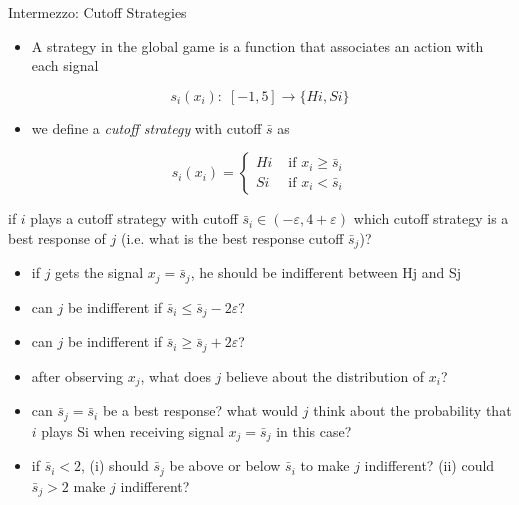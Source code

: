 \documentclass[bigger,allowframebreaks]{beamer}
\begin{document}
\begin{frame}[allowframebreaks,label=]{Intermezzo: Cutoff Strategies}

\begin{itemize}
\item A strategy in the global game is a function that associates an action with each signal
\end{itemize}
$$s_i(x_i): \;[-1,5]\rightarrow\{Hi,Si\}$$
\begin{itemize}
\item we define a \emph{cutoff strategy} with cutoff $\bar s$ as
\end{itemize}
$$ s_i(x_i)=\begin{cases}
Hi & \text{ if }x_i\geq \bar s_i\\
Si & \text{ if }x_i<\bar s_i
\end{cases}$$

\framebreak

if $i$ plays a cutoff strategy with cutoff $\bar s_i\in(-\varepsilon,4+\varepsilon)$ which cutoff strategy is a best response of $j$ (i.e. what is the best response cutoff $\bar s_j$)?
\begin{itemize}
\item if $j$ gets the signal $x_j=\bar s_j$, he should be indifferent between Hj and Sj
\item can $j$ be indifferent if $\bar s_i\leq \bar s_j-2\varepsilon$?
\item can $j$ be indifferent if $\bar s_i\geq \bar s_j+2\varepsilon$?
\item after observing $x_j$, what does $j$ believe about the distribution of $x_i$?
\end{itemize}
\begin{itemize}
\item can $\bar s_j=\bar s_i$ be a best response? what would $j$ think about the probability that $i$ plays Si when receiving signal $x_j=\bar s_j$ in this case?
\end{itemize}
\begin{itemize}
\item if $\bar s_i<2$, (i) should $\bar s_j$ be above or below $\bar s_i$ to make $j$ indifferent? (ii) could $\bar s_j>2$ make $j$ indifferent?
\end{itemize}
\end{frame}
\end{document}
